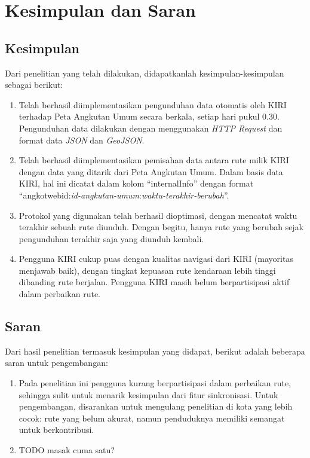 \chapter{Kesimpulan dan Saran}

\section{Kesimpulan}

Dari penelitian yang telah dilakukan, didapatkanlah kesimpulan-kesimpulan sebagai berikut:

\begin{enumerate}
	\item Telah berhasil diimplementasikan pengunduhan data otomatis oleh KIRI terhadap Peta Angkutan Umum secara berkala, setiap hari pukul 0.30. Pengunduhan data dilakukan dengan menggunakan \textit{HTTP Request} dan format data \textit{JSON} dan \textit{GeoJSON}.
	\item Telah berhasil diimplementasikan pemisahan data antara rute milik KIRI dengan data yang ditarik dari Peta Angkutan Umum. Dalam basis data KIRI, hal ini dicatat dalam kolom ``internalInfo'' dengan format ``angkotwebid:\textit{id-angkutan-umum}:\textit{waktu-terakhir-berubah}''.
	\item Protokol yang digunakan telah berhasil dioptimasi, dengan mencatat waktu terakhir sebuah rute diunduh. Dengan begitu, hanya rute yang berubah sejak pengunduhan terakhir saja yang diunduh kembali.
	\item Pengguna KIRI cukup puas dengan kualitas navigasi dari KIRI (mayoritas menjawab baik), dengan tingkat kepuasan rute kendaraan lebih tinggi dibanding rute berjalan. Pengguna KIRI masih belum berpartisipasi aktif dalam perbaikan rute.
\end{enumerate}

\section{Saran}

Dari hasil penelitian termasuk kesimpulan yang didapat, berikut adalah beberapa saran untuk pengembangan:

\begin{enumerate}
	\item Pada penelitian ini pengguna kurang berpartisipasi dalam perbaikan rute, sehingga sulit untuk menarik kesimpulan dari fitur sinkronisasi. Untuk pengembangan, disarankan untuk mengulang penelitian di kota yang lebih cocok: rute yang belum akurat, namun penduduknya memiliki semangat untuk berkontribusi.
	\item TODO masak cuma satu?
\end{enumerate}